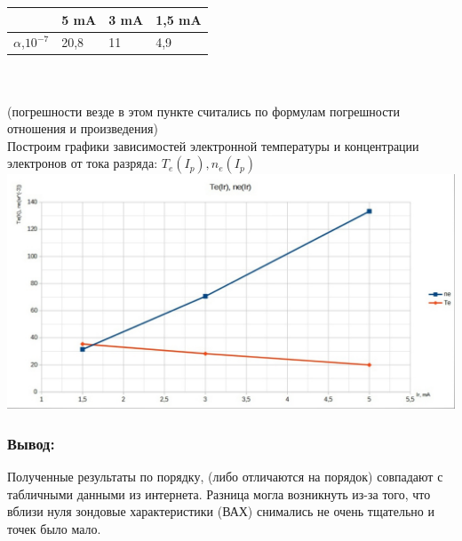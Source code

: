 \documentclass[11pt]{article}
\begin{document}
\begin{tabular}{|l|l|l|l|}
\hline
 & 5 mA & 3 mA & 1,5 mA\\
\hline
$ \alpha$,$10^{-7}$ & 20,8 & 11 & 4,9
\\
\hline
\end{tabular}
\\
\\
(погрешности везде в этом пункте считались по формулам погрешности отношения и произведения)\\
Построим графики зависимостей электронной температуры и концентрации электронов от тока разряда: $T_{e}(I_{p}), n_{e}(I_{p})$\\
\includegraphics[width = 19.5cm]{zav}\\
\newpage
\subsubsection*{Вывод:}
Полученные результаты по порядку, (либо отличаются на порядок) совпадают с табличными данными из интернета. Разница могла возникнуть из-за того, что вблизи нуля зондовые характеристики (ВАХ) снимались не очень тщательно и точек было мало.\\
\end{document}
